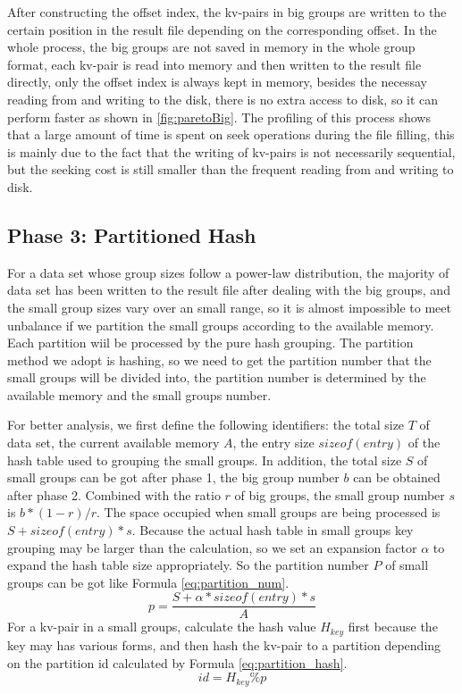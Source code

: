 After constructing the offset index, the kv-pairs in big groups are written to the certain position in the result file depending on the corresponding offset. In the whole process, the big groups are not saved in memory in the whole group format, each kv-pair is read into memory and then written to the result file directly, only the offset index is always kept in memory, besides the necessay reading from and writing to the disk, there is no extra access to disk, so it can perform faster as shown in \ref{fig:paretoBig}. The profiling of this process shows that a large amount of time is spent on seek operations during the file filling, this is mainly due to the fact that the writing of kv-pairs is not necessarily sequential, but the seeking cost is still smaller than the frequent reading from and writing to disk. 

\subsection{Phase 3: Partitioned Hash}

For a data set whose group sizes follow a power-law distribution, the majority of data set has been written to the result file after dealing with the big groups, and the small group sizes vary over an small range, so it is almost impossible to meet unbalance if we partition the small groups according to the available memory. Each partition wiil be processed by the pure hash grouping. The partition method we adopt is hashing, so we need to get the partition number that the small groups will be divided into, the partition number is determined by the available memory and the small groups number. 

For better analysis, we first define the following identifiers: the total size $T$ of data set, the current available memory $A$, the entry size $sizeof(entry)$ of the hash table used to grouping the small groups. In addition, the total size $S$ of small groups can be got after phase 1, the big group number $b$ can be obtained after phase 2. Combined with the ratio $r$ of big groups, the small group number $s$ is $b*(1-r)/r$. The space occupied when small groups are being processed is $S + sizeof(entry)*s$.
Because the actual hash table in small groups key grouping may be larger than the calculation, so we set an expansion factor $\alpha$ to expand the hash table size appropriately. So the partition number $P$ of small groups can be got like Formula \ref{eq:partition_num}. 
\begin{equation}\label{eq:partition_num}
    p = \dfrac{S + \alpha*sizeof(entry)*s}{A}
\end{equation}
For a kv-pair in a small groups, calculate the hash value $H_{key}$ first because the key may has various forms, and then hash the kv-pair to a partition depending on the partition id calculated by Formula \ref{eq:partition_hash}.
\begin{equation}\label{eq:partition_hash}
    id = H_{key} \%  p
\end{equation}  


